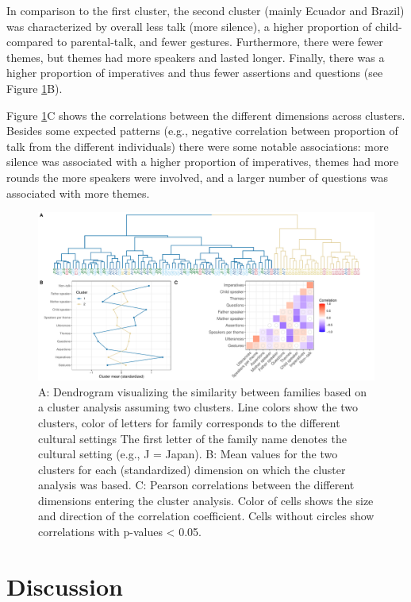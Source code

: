 \documentclass[
  man,floatsintext]{apa6}
\begin{document}
In comparison to the first cluster, the second cluster (mainly Ecuador and Brazil) was characterized by overall less talk (more silence), a higher proportion of child- compared to parental-talk, and fewer gestures. Furthermore, there were fewer themes, but themes had more speakers and lasted longer. Finally, there was a higher proportion of imperatives and thus fewer assertions and questions (see Figure \ref{fig:fig4}B).

Figure \ref{fig:fig4}C shows the correlations between the different dimensions across clusters. Besides some expected patterns (e.g., negative correlation between proportion of talk from the different individuals) there were some notable associations: more silence was associated with a higher proportion of imperatives, themes had more rounds the more speakers were involved, and a larger number of questions was associated with more themes.

\begin{figure}
\includegraphics[width=1\linewidth]{../visuals/fig4} \caption{A: Dendrogram visualizing the similarity between families based on a cluster analysis assuming two clusters. Line colors show the two clusters, color of letters for family corresponds to the different cultural settings The first letter of the family name denotes the cultural setting (e.g., J = Japan). B: Mean values for the two clusters for each (standardized) dimension on which the cluster analysis was based. C: Pearson correlations between the different dimensions entering the cluster analysis. Color of cells shows the size and direction of the correlation coefficient. Cells without circles show correlations with p-values < 0.05.}\label{fig:fig4}
\end{figure}

\hypertarget{discussion}{%
\section{Discussion}\label{discussion}}
\end{document}
